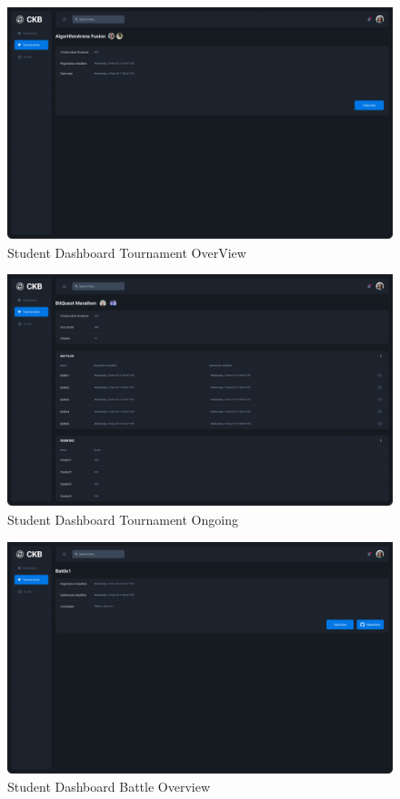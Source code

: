 \begin{figure}[H]
    \centering
    \includegraphics[width=\textwidth]{Images/Dashboard-Tournament-OverView.png}
    \caption{Student Dashboard Tournament OverView}
    \label{fig:student-Tournament-OverView}
\end{figure}

\begin{figure}[H]
    \centering
    \includegraphics[width=\textwidth]{Images/Dashboard-Tournament-Ongoing.png}
    \caption{Student Dashboard Tournament Ongoing}
    \label{fig:student-Tournament-Ongoing}
\end{figure}

\begin{figure}[H]
    \centering
    \includegraphics[width=\textwidth]{Images/Dashboard-Battle-Overview.png}
    \caption{Student Dashboard Battle Overview}
    \label{fig:student-Tournament-Completed}
\end{figure}


